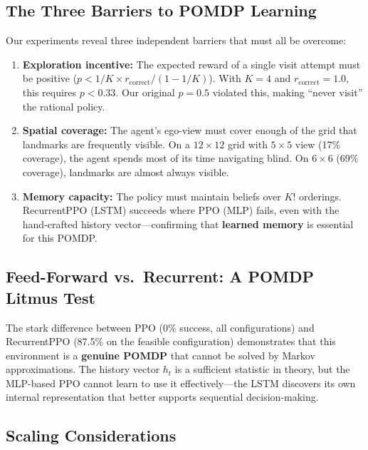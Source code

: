 \documentclass[11pt,a4paper]{article}
\begin{document}
\subsection{The Three Barriers to POMDP Learning}

Our experiments reveal three independent barriers that must all be overcome:

\begin{enumerate}
  \item \textbf{Exploration incentive:} The expected reward of a single
        visit attempt must be positive ($p < 1/K \times r_{\text{correct}} /
        (1 - 1/K)$). With $K=4$ and $r_{\text{correct}}=1.0$, this requires
        $p < 0.33$. Our original $p=0.5$ violated this, making
        ``never visit'' the rational policy.

  \item \textbf{Spatial coverage:} The agent's ego-view must cover enough of
        the grid that landmarks are frequently visible. On a $12\times12$ grid
        with $5\times5$ view (17\% coverage), the agent spends most of its
        time navigating blind. On $6\times6$ (69\% coverage), landmarks are
        almost always visible.

  \item \textbf{Memory capacity:} The policy must maintain beliefs over
        $K!$ orderings. RecurrentPPO (LSTM) succeeds where PPO (MLP) fails,
        even with the hand-crafted history vector---confirming that
        \textbf{learned memory} is essential for this POMDP.
\end{enumerate}

\subsection{Feed-Forward vs.\ Recurrent: A POMDP Litmus Test}

The stark difference between PPO (0\% success, all configurations) and
RecurrentPPO (87.5\% on the feasible configuration) demonstrates that this
environment is a \textbf{genuine POMDP} that cannot be solved by Markov
approximations. The history vector $h_t$ is a sufficient statistic in
theory, but the MLP-based PPO cannot learn to use it effectively---the LSTM
discovers its own internal representation that better supports sequential
decision-making.

\subsection{Scaling Considerations}
\end{document}
